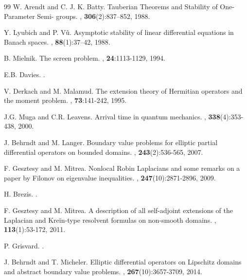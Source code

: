 \documentclass{article}
\numberwithin{equation}{section}
\begin{document}
\begin{thebibliography}{99}
W. Arendt and C. J. K. Batty.
\newblock Tauberian Theorems and Stability of One-Parameter Semi-
groups.
, \textbf{306}(2):837–852, 1988.

Y. Lyubich and P. Vũ.
\newblock Asymptotic stability of linear differential equations in Banach spaces.
, \textbf{88}(1):37–42, 1988.

B. Mielnik.
\newblock The screen problem.
, \textbf{24}:1113-1129, 1994.

E.B. Davies.
.

V. Derkach and M. Malamud.
\newblock The extension theory of Hermitian operators and the moment problem.
, \textbf{73}:141-242, 1995.

J.G. Muga and C.R. Leavens.
\newblock Arrival time in quantum mechanics.
, \textbf{338}(4):353-438, 2000.

J. Behrndt and M. Langer.
\newblock Boundary value problems for elliptic partial differential operators on bounded domains.
, \textbf{243}(2):536-565, 2007.

F. Gesztesy and M. Mitrea. \newblock Nonlocal Robin Laplacians and some remarks on a paper by Filonov on eigenvalue inequalities.
, \textbf{247}(10):2871-2896, 2009.

H. Brezis.
.

F. Gesztesy and M. Mitrea. \newblock A description of all self-adjoint extensions of the Laplacian and
Kreĭn-type resolvent formulas on non-smooth domains.
, \textbf{113}(1):53-172, 2011.

P. Grisvard.
.

J. Behrndt and T. Micheler. \newblock Elliptic differential operators on Lipschitz domains and abstract
boundary value problems.
, \textbf{267}(10):3657-3709, 2014.


\end{thebibliography}
\end{document}
